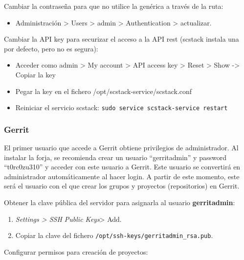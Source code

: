 \par Cambiar la contraseña para que no utilice la genérica a través de la ruta:

\begin{itemize}
\item Administración \textgreater{} Users \textgreater{} admin \textgreater{} Authentication \textgreater{} actualizar.
\end{itemize}

\par Cambiar la API key para securizar el acceso a la API rest (scstack instala una por defecto, pero no es segura):

\begin{itemize}
    \item Acceder como admin \textgreater{} My account \textgreater{} API  access key \textgreater{} Reset \textgreater{} Show -\textgreater{} Copiar la key
    \item Pegar la key en el fichero /opt/scstack-service/scstack.conf
    \item Reiniciar el servicio scstack: \texttt{sudo service scstack-service restart}
\end{itemize}

\subsubsection{Gerrit}
\label{subs:conf-gerrit}

\par El primer usuario que accede a Gerrit obtiene privilegios de administrador. Al instalar la forja, se recomienda crear un usuario ``gerritadmin'' y password ``t0rc0zu310'' y acceder con este usuario a Gerrit. Este usuario se convertirá en administrador automáticamente al hacer login. A partir de este momento, este será el usuario con el que crear los grupos y proyectos (repositorios) en Gerrit.

\par Obtener la clave pública del servidor para asignarla al usuario \textbf{gerritadmin}:

\begin{enumerate}
\item \emph{Settings \textgreater{} SSH Public Keys}\textgreater{} Add.
\item Copiar la clave del fichero \texttt{/opt/ssh-keys/gerritadmin\_rsa.pub}.
\end{enumerate}

\par Configurar permisos para creación de proyectos:

